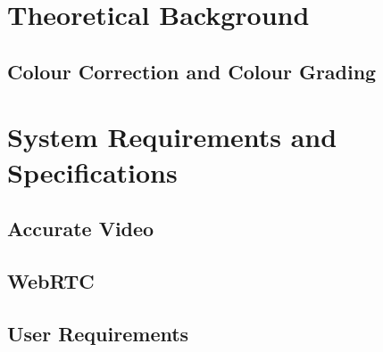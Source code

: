 \documentclass[12pt,a4paper]{article}
\begin{document}
\section{Theoretical Background} \label{section:theoreticalbackground}



\subsection{Colour Correction and Colour Grading}







%
%
%
%
%
%
%
%
\newpage
\section{System Requirements and Specifications} \label{section:requirements}


\subsection{Accurate Video}


\subsection{WebRTC}


\subsection{User Requirements}
\end{document}
